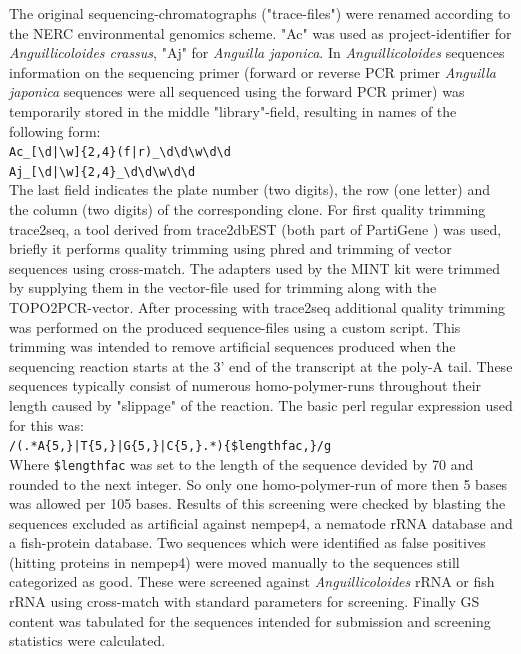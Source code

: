 \documentclass[12pt,a4paper]{article}
\begin{document}
The original sequencing-chromatographs ("trace-files") were renamed
according to the NERC environmental genomics scheme. "Ac" was used as
project-identifier for \textit{Anguillicoloides crassus}, "Aj" for
\textit{Anguilla japonica}. In \textit{Anguillicoloides} sequences
information on the sequencing primer (forward or reverse PCR primer
\textit{Anguilla japonica} sequences were all sequenced using the
forward PCR primer) was temporarily stored in the middle
"library"-field, resulting in names of the following form:\\
\texttt{Ac\_[\textbackslash{}d|\textbackslash{}w]\{2,4\}(f|r)\_\textbackslash{}d\textbackslash{}d\textbackslash{}w\textbackslash{}d\textbackslash{}d}\\
\texttt{Aj\_[\textbackslash{}d|\textbackslash{}w]\{2,4\}\_\textbackslash{}d\textbackslash{}d\textbackslash{}w\textbackslash{}d\textbackslash{}d}\\
The last field indicates the plate number (two digits), the row (one
letter) and the column (two digits) of the corresponding clone. For
first quality trimming trace2seq, a tool derived from trace2dbEST
(both part of PartiGene \cite{parkinson_partigene--constructing_2004})
was used, briefly it performs quality trimming using
phred\cite{ewing_base-calling_1998} and trimming of vector sequences
using cross-match\cite{PHRAP}. The adapters used by the MINT kit were
trimmed by supplying them in the vector-file used for trimming along
with the TOPO2PCR-vector.  After processing with trace2seq additional
quality trimming was performed on the produced sequence-files using a
custom script. This trimming was intended to remove artificial
sequences produced when the sequencing reaction starts at the 3' end
of the transcript at the poly-A tail. These sequences typically
consist of numerous homo-polymer-runs throughout their length caused
by "slippage" of the reaction.
The basic perl regular expression used for this was:\\
\texttt{/(.*A\{5,\}|T\{5,\}|G\{5,\}|C\{5,\}.*)\{\$lengthfac,\}/g}\\
Where \texttt{\$lengthfac} was set to the length of the sequence
devided by 70 and rounded to the next integer. So only one
homo-polymer-run of more then 5 bases was allowed per 105 bases.
Results of this screening were checked by blasting the sequences
excluded as artificial against nempep4, a nematode rRNA database and a
fish-protein database. Two sequences which were identified as false
positives (hitting proteins in nempep4) were moved manually to the
sequences still categorized as good. These were screened against
\textit{Anguillicoloides} rRNA or fish rRNA using
cross-match\cite{PHRAP} with standard parameters for screening.
Finally GS content was tabulated for the sequences intended for
submission and screening statistics were calculated.
\end{document}
